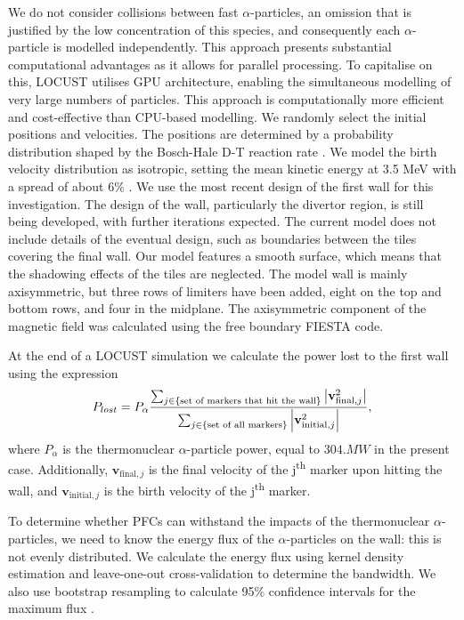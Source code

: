 \documentclass[10pt, a4paper, twoside]{article}
\begin{document}
We do not consider collisions between fast $\alpha$-particles, an omission that is justified by the low concentration of this species, and consequently each $\alpha$-particle is modelled independently. This approach presents substantial computational advantages as it allows for parallel processing. To capitalise on this, LOCUST utilises GPU architecture, enabling the simultaneous modelling of very large numbers of particles. This approach is computationally more efficient and cost-effective than CPU-based modelling. We randomly select the initial positions and velocities. The positions are determined by a probability distribution shaped by the Bosch-Hale D-T reaction rate \cite{bosch1992}. We model the birth velocity distribution as isotropic, setting the mean kinetic energy at 3.5 MeV with a spread of about 6\% \cite{brysk1973}. We use the most recent design of the first wall for this investigation. The design of the wall, particularly the divertor region, is still being developed, with further iterations expected. The current model does not include details of the eventual design, such as boundaries between the tiles covering the final wall. Our model features a smooth surface, which means that the shadowing effects of the tiles are neglected. The model wall is mainly axisymmetric, but three rows of limiters have been added, eight on the top and bottom rows, and four in the midplane. The axisymmetric component of the magnetic field was calculated using the free boundary FIESTA code. 

At the end of a LOCUST simulation we calculate the power lost to the first wall using the expression 
\begin{equation} 
P_{lost} = P_\alpha \frac{\sum_{j\in \text{\{set of markers that hit the wall\}}}\abs{\textbf{v}_{\text{final}, j}^2}}{\sum_{j \in \{\text{set of all markers}\}} \abs{\mathbf{v}_{\text{initial}, j}^2 }}, 
\end{equation}
where $P_\alpha$ is the thermonuclear $\alpha$-particle power, equal to $\si{304.MW}$ in the present case. Additionally, $\mathbf{v}_{\text{final}, j}$ is the final velocity of the j\textsuperscript{th} marker upon hitting the wall, and $\mathbf{v}_{\text{initial}, j}$ is the birth velocity of the j\textsuperscript{th} marker.

To determine whether PFCs can withstand the impacts of the thermonuclear $\alpha$-particles, we need to know the energy flux of the $\alpha$-particles on the wall: this is not evenly distributed. We calculate the energy flux using kernel density estimation \cite{chen2017} and leave-one-out cross-validation \cite{chen2017} to determine the bandwidth. We also use bootstrap resampling to calculate 95\% confidence intervals for the maximum flux \cite{chen2017}.
\end{document}

